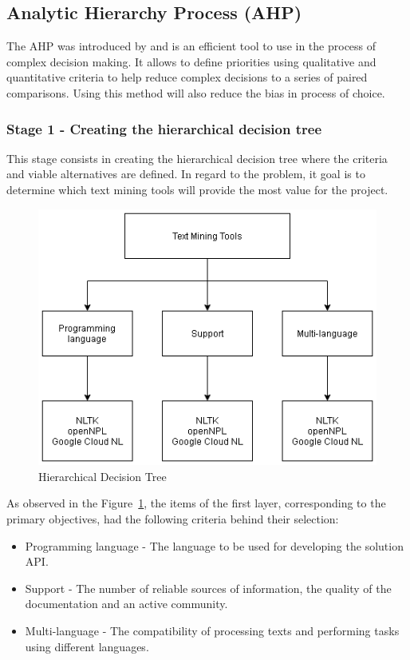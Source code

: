 \subsection{Analytic Hierarchy Process (AHP)}

The \gls{AHP} was introduced by \textcite{saaty_1987} and is an efficient tool to use in the process of complex decision making.
It allows to define priorities using qualitative and quantitative criteria to help reduce complex decisions to a series of paired comparisons.
Using this method will also reduce the bias in process of choice.

\subsubsection{Stage 1 - Creating the hierarchical decision tree}

This stage consists in creating the hierarchical decision tree where the criteria and viable alternatives are defined.
In regard to the problem, it goal is to determine which text mining tools will provide the most value for the project.

\begin{figure}[H]
\centering
\includegraphics[scale=0.5]{ch3/assets/AHP.png}
\caption[Hierarchical Decision Tree]{Hierarchical Decision Tree}
\label{fig:AHP}
\end{figure}

As observed in the Figure~\ref{fig:AHP}, the items of the first layer, corresponding to the primary objectives, had the following criteria behind their selection:

\begin{itemize}
    \item Programming language - The language to be used for developing the solution \gls{API}.
    \item Support - The number of reliable sources of information, the quality of the documentation and an active community.
    \item Multi-language - The compatibility of processing texts and performing tasks using different languages.
\end{itemize}

